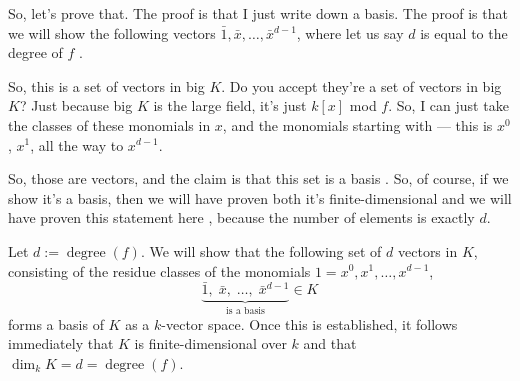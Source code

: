 \begin{content}
\end{content}

\begin{proofWrapper}

\begin{speech}[00:04:06 - 00:05:17]
So, let's prove that. The proof is that I just write down a basis. The proof is that we will show the following vectors $\bar{1}, \bar{x}, \dots, \bar{x}^{d-1}$, where let us say $d$ is equal to the degree of $f$ .

So, this is a set of vectors in big $K$. Do you accept they're a set of vectors in big $K$? Just because big $K$ is the large field, it's just $k[x]$ mod $f$. So, I can just take the classes of these monomials in $x$, and the monomials starting with --- this is $x^0$, $x^1$, all the way to $x^{d-1}$.

So, those are vectors, and the claim is that this set is a basis . So, of course, if we show it's a basis, then we will have proven both it's finite-dimensional and we will have proven this statement here , because the number of elements is exactly $d$.
\end{speech}

\begin{content}
Let $d := \operatorname{degree}(f)$. We will show that the following set of $d$ vectors in $K$, consisting of the residue classes of the monomials $1 = x^0, x^1, \dots, x^{d-1}$,
\[
\underbrace{\bar{1},\; \bar{x},\; \dots,\; \bar{x}^{d-1}}_{\text{is a basis}} \in K
\]
forms a basis of $K$ as a $k$-vector space. Once this is established, it follows immediately that $K$ is finite-dimensional over $k$ and that $\dim_k K = d = \operatorname{degree}(f)$.
\end{content}


\end{proofWrapper}
